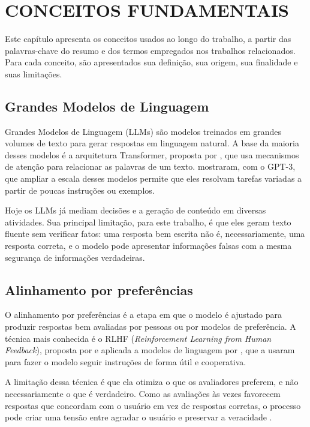 \chapter{CONCEITOS FUNDAMENTAIS} \label{conceitos}

Este capítulo apresenta os conceitos usados ao longo do trabalho, a partir das palavras-chave do resumo e dos termos empregados nos trabalhos relacionados. Para cada conceito, são apresentados sua definição, sua origem, sua finalidade e suas limitações.

\section{Grandes Modelos de Linguagem}

Grandes Modelos de Linguagem (LLMs) são modelos treinados em grandes volumes de texto para gerar respostas em linguagem natural. A base da maioria desses modelos é a arquitetura Transformer, proposta por \textcite{vaswani2017attention}, que usa mecanismos de atenção para relacionar as palavras de um texto. \textcite{brown2020language} mostraram, com o GPT-3, que ampliar a escala desses modelos permite que eles resolvam tarefas variadas a partir de poucas instruções ou exemplos.

Hoje os LLMs já mediam decisões e a geração de conteúdo em diversas atividades. Sua principal limitação, para este trabalho, é que eles geram texto fluente sem verificar fatos: uma resposta bem escrita não é, necessariamente, uma resposta correta, e o modelo pode apresentar informações falsas com a mesma segurança de informações verdadeiras.

\section{Alinhamento por preferências}

O alinhamento por preferências é a etapa em que o modelo é ajustado para produzir respostas bem avaliadas por pessoas ou por modelos de preferência. A técnica mais conhecida é o RLHF (\textit{Reinforcement Learning from Human Feedback}), proposta por \textcite{christiano2017deep} e aplicada a modelos de linguagem por \textcite{ouyang2022training}, que a usaram para fazer o modelo seguir instruções de forma útil e cooperativa.

A limitação dessa técnica é que ela otimiza o que os avaliadores preferem, e não necessariamente o que é verdadeiro. Como as avaliações às vezes favorecem respostas que concordam com o usuário em vez de respostas corretas, o processo pode criar uma tensão entre agradar o usuário e preservar a veracidade \cite{sharma2024towards}.

